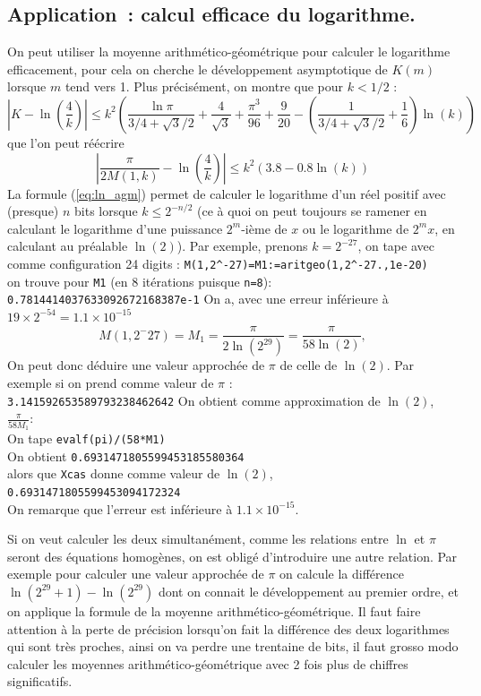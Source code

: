 \documentclass[a4paper,11pt]{book}
\begin{document}
\subsection{Application~: calcul efficace du logarithme.}
On peut utiliser la moyenne arithm\'etico-g\'eom\'etrique pour
calculer le logarithme efficacement, pour cela on cherche le d\'eveloppement
asymptotique de $K(m)$ lorsque $m$ tend vers 1.
 Plus pr\'ecis\'ement, on montre que pour $k<1/2$ :
\begin{equation} \label{eq:ln_agm0}
 |K-\ln\left(\frac{4}{k}\right) | 
\leq k^2 \left( \frac{\ln \pi}{3/4+\sqrt{3}/2}  + \frac{4}{\sqrt{3} }
+ \frac{\pi^3}{96} + \frac{9}{20}
- (\frac{1}{3/4+\sqrt{3}/2}+\frac{1}{6}) \ln(k) \right) 
\end{equation}
que l'on peut r\'e\'ecrire
\begin{equation} \label{eq:ln_agm}
|\frac{\pi}{2M(1,k)}-\ln\left(\frac{4}{k}\right) |
\leq  k^2(3.8-0.8\ln(k))
\end{equation}
La formule (\ref{eq:ln_agm}) 
permet de calculer le logarithme d'un r\'eel positif
avec (presque) $n$ bits 
lorsque $k \leq 2^{-n/2}$ (ce \`a quoi on peut toujours se ramener
en calculant le logarithme d'une puissance $2^m$-i\`eme de $x$ ou
le logarithme de $2^{m}x$, en calculant au pr\'ealable $\ln(2)$).
Par exemple, prenons $k=2^{-27}$, on tape avec comme configuration 24 digits :
{\tt M(1,2\verb|^|-{27})=M1:=aritgeo(1,2\verb|^|-27.,1e-20)}\\
on trouve pour {\tt M1} (en 8 it\'erations puisque {\tt n=8}):
{\tt 0.7814414037633092672168387e-1}
On a, avec une erreur inf\'erieure \`a $19 \times 2^{-54}=1.1\times 10^{-15}$
\[ 
M(1,2^-{27})=M_1=\frac{\pi}{2\ln(2^{29})}=\frac{\pi}{58\ln(2)},
\] 
On peut donc d\'eduire une valeur approch\'ee de $\pi $ de celle de $\ln(2)$.
Par exemple si on prend comme valeur de $\pi$ :\\
{\tt 3.141592653589793238462642}
On obtient comme approximation de $\ln(2)$, $\frac{\pi}{58M_1}$:\\
On tape {\tt evalf(pi)/(58*M1)}\\
On obtient {\tt 0.6931471805599453185580364}\\
 alors que {\tt Xcas} donne
comme valeur de $\ln(2)$, \\
{\tt 0.6931471805599453094172324}\\
On remarque que l'erreur est inf\'erieure \`a $1.1\times 10^{-15}$.

Si on veut calculer les deux simultan\'ement, comme les relations entre $\ln$
et $\pi$ seront des \'equations homog\`enes, on est oblig\'e
d'introduire une autre relation. Par exemple pour calculer une
valeur approch\'ee de $\pi$ on calcule la diff\'erence
$\ln(2^{29}+1)-\ln(2^{29})$ dont on connait le d\'eveloppement au premier
ordre, et on applique la formule de la moyenne arithm\'etico-g\'eom\'etrique.
Il faut faire attention \`a la perte de pr\'ecision lorsqu'on fait
la diff\'erence des deux logarithmes qui sont tr\`es proches, ainsi
on va perdre une trentaine de bits, il faut grosso modo calculer les
moyennes arithm\'etico-g\'eom\'etrique avec
2 fois plus de chiffres significatifs.
\end{document}

